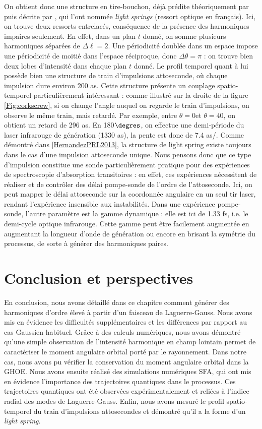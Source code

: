 On obtient donc une structure en tire-bouchon, déjà prédite théoriquement par  puis décrite par , qui l'ont nommée \textit{light springs} (ressort optique en français). Ici, on trouve deux ressorts entrelacés, conséquence de la présence des harmoniques impaires seulement. En effet, dans un plan $t$ donné, on somme plusieurs harmoniques séparées de $\Delta\ell = 2$. Une périodicité doublée dans un espace impose une périodicité de moitié dans l'espace réciproque, donc $\Delta\theta = \pi$ : on trouve bien deux lobes d'intensité dans chaque plan $t$ donné. Le profil temporel quant à lui possède bien une structure de train d'impulsions attoseconde, où chaque impulsion dure environ 200 as. Cette structure présente un couplage spatio-temporel particulièrement intéressant : comme illustré sur la droite de la figure \ref{Fig:corkscrew}, si on change l'angle auquel on regarde le train d'impulsions, on observe le même train, mais retardé. Par exemple, entre $\theta=0$\degres et $\theta=40$\degres, on obtient un retard de 296 as. En 180$\degres$, on effectue une demi-période du laser infrarouge de génération (1330 as), la pente est donc de 7.4 as/\degres. 
Comme démontré dans \ref{HernandezPRL2013}, la structure de light spring existe toujours dans le cas d'une impulsion attoseconde unique. Nous pensons donc que ce type d'impulsion constitue une sonde particulièrement pratique pour des expériences de spectroscopie d'absorption transitoires : en effet, ces expériences nécessitent de réaliser et de contrôler des délai pompe-sonde de l'ordre de l'attoseconde. Ici, on peut mapper le délai attoseconde sur la coordonnée angulaire en un seul tir laser, rendant l'expérience insensible aux instabilités. Dans une expérience pompe-sonde, l'autre paramètre est la gamme dynamique : elle est ici de 1.33 fs, i.e. le demi-cycle optique infrarouge. Cette gamme peut être facilement augmentée en augmentant la longueur d'onde de génération ou encore en brisant la symétrie du processus, de sorte à générer des harmoniques paires.

\chapter{Conclusion et perspectives}
En conclusion, nous avons détaillé dans ce chapitre comment générer des harmoniques d'ordre élevé à partir d'un faisceau de Laguerre-Gauss. Nous avons mis en évidence les difficultés supplémentaires et les différences par rapport au cas Gaussien habituel. Grâce à des calculs numériques, nous avons démontré qu'une simple observation de l'intensité harmonique en champ lointain permet de caractériser le moment angulaire orbital porté par le rayonnement. Dans notre cas, nous avons pu vérifier la conservation du moment angulaire orbital dans la GHOE. Nous avons ensuite réalisé des simulations numériques SFA, qui ont mis en évidence l'importance des trajectoires quantiques dans le processus. Ces trajectoires quantiques ont été observées expérimentalement et reliées à l'indice radial des modes de Laguerre-Gauss. Enfin, nous avons mesuré le profil spatio-temporel du train d'impulsions attosecondes et démontré qu'il a la forme d'un \textit{light spring}.

